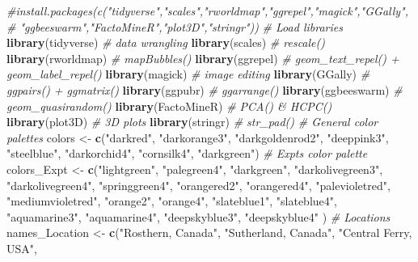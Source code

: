 \documentclass[
]{article}
\newenvironment{Shaded}{\begin{snugshade}}{\end{snugshade}}
\newcommand{\CommentTok}[1]{\textcolor[rgb]{0.56,0.35,0.01}{\textit{#1}}}
\newcommand{\KeywordTok}[1]{\textcolor[rgb]{0.13,0.29,0.53}{\textbf{#1}}}
\newcommand{\NormalTok}[1]{#1}
\newcommand{\StringTok}[1]{\textcolor[rgb]{0.31,0.60,0.02}{#1}}
\begin{document}
\begin{Shaded}
\begin{Highlighting}[]
\CommentTok{#install.packages(c("tidyverse","scales","rworldmap","ggrepel","magick","GGally",}
\CommentTok{#                   "ggbeeswarm","FactoMineR","plot3D","stringr"))}
\CommentTok{# Load libraries}
\KeywordTok{library}\NormalTok{(tidyverse)  }\CommentTok{# data wrangling}
\KeywordTok{library}\NormalTok{(scales)     }\CommentTok{# rescale()}
\KeywordTok{library}\NormalTok{(rworldmap)  }\CommentTok{# mapBubbles()}
\KeywordTok{library}\NormalTok{(ggrepel)    }\CommentTok{# geom_text_repel() + geom_label_repel()}
\KeywordTok{library}\NormalTok{(magick)     }\CommentTok{# image editing}
\KeywordTok{library}\NormalTok{(GGally)     }\CommentTok{# ggpairs() + ggmatrix()}
\KeywordTok{library}\NormalTok{(ggpubr)     }\CommentTok{# ggarrange()}
\KeywordTok{library}\NormalTok{(ggbeeswarm) }\CommentTok{# geom_quasirandom()}
\KeywordTok{library}\NormalTok{(FactoMineR) }\CommentTok{# PCA() & HCPC()}
\KeywordTok{library}\NormalTok{(plot3D)     }\CommentTok{# 3D plots}
\KeywordTok{library}\NormalTok{(stringr)    }\CommentTok{# str_pad()}
\CommentTok{# General color palettes }
\NormalTok{colors <-}\StringTok{ }\KeywordTok{c}\NormalTok{(}\StringTok{"darkred"}\NormalTok{,   }\StringTok{"darkorange3"}\NormalTok{, }\StringTok{"darkgoldenrod2"}\NormalTok{, }\StringTok{"deeppink3"}\NormalTok{, }
            \StringTok{"steelblue"}\NormalTok{, }\StringTok{"darkorchid4"}\NormalTok{, }\StringTok{"cornsilk4"}\NormalTok{,      }\StringTok{"darkgreen"}\NormalTok{) }
\CommentTok{# Expts color palette}
\NormalTok{colors_Expt <-}\StringTok{ }\KeywordTok{c}\NormalTok{(}\StringTok{"lightgreen"}\NormalTok{,      }\StringTok{"palegreen4"}\NormalTok{,       }\StringTok{"darkgreen"}\NormalTok{,   }\StringTok{"darkolivegreen3"}\NormalTok{,}
                 \StringTok{"darkolivegreen4"}\NormalTok{, }\StringTok{"springgreen4"}\NormalTok{,     }\StringTok{"orangered2"}\NormalTok{,  }\StringTok{"orangered4"}\NormalTok{,}
                 \StringTok{"palevioletred"}\NormalTok{,    }\StringTok{"mediumvioletred"}\NormalTok{, }\StringTok{"orange2"}\NormalTok{,     }\StringTok{"orange4"}\NormalTok{, }
                 \StringTok{"slateblue1"}\NormalTok{,       }\StringTok{"slateblue4"}\NormalTok{,      }\StringTok{"aquamarine3"}\NormalTok{, }\StringTok{"aquamarine4"}\NormalTok{, }
                 \StringTok{"deepskyblue3"}\NormalTok{,     }\StringTok{"deepskyblue4"}\NormalTok{ )}
\CommentTok{# Locations}
\NormalTok{names_Location <-}\StringTok{ }\KeywordTok{c}\NormalTok{(}\StringTok{"Rosthern, Canada"}\NormalTok{, }\StringTok{"Sutherland, Canada"}\NormalTok{,  }\StringTok{"Central Ferry, USA"}\NormalTok{,}

\end{Highlighting}
\end{Shaded}
\end{document}
